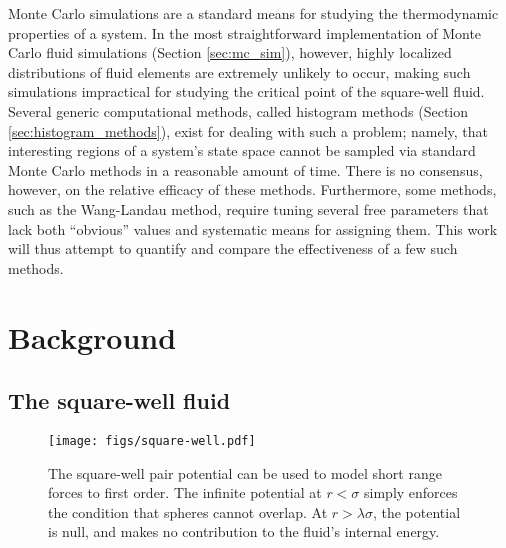 \documentclass[11pt]{article}
\begin{document}
Monte Carlo simulations are a standard means for studying the
thermodynamic properties of a system. In the most straightforward
implementation of Monte Carlo fluid simulations (Section
\ref{sec:mc_sim}), however, highly localized distributions of fluid
elements are extremely unlikely to occur, making such simulations
impractical for studying the critical point of the square-well
fluid. Several generic computational methods, called histogram methods
(Section \ref{sec:histogram_methods}), exist for dealing with such a
problem; namely, that interesting regions of a system's state space
cannot be sampled via standard Monte Carlo methods in a reasonable
amount of time. There is no consensus, however, on the relative
efficacy of these methods. Furthermore, some methods, such as the
Wang-Landau method\cite{wang_landau}, require tuning several free
parameters that lack both ``obvious'' values and systematic means for
assigning them. This work will thus attempt to quantify and compare
the effectiveness of a few such methods.


\section{Background}
\label{sec:background}

\subsection{The square-well fluid}
\label{sec:sw_fluid}

\begin{figure}[tb]
  \centering
  \texttt{[image: figs/square-well.pdf]}
  \caption[The square-well pair potential]{The square-well pair
    potential can be used to model short range forces to first
    order. The infinite potential at $r<\sigma$ simply enforces the
    condition that spheres cannot overlap. At $r>\lambda\sigma$, the
    potential is null, and makes no contribution to the fluid's
    internal energy.}
  \label{fig:pair_potential}
\end{figure}
\end{document}
